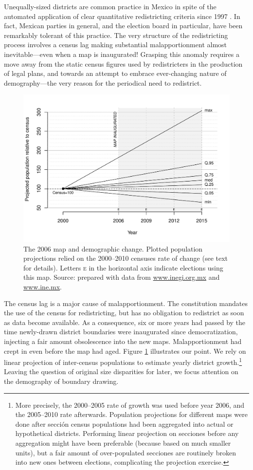 \documentclass[letter,12pt]{article}
\begin{document}
Unequally-sized districts are common practice in Mexico in spite of the automated application of clear quantitative redistricting criteria since 1997 \citep{altman.magar.mcd.trelles2014apsa}. In fact, Mexican parties in general, and the election board in particular, have been remarkably tolerant of this practice. The very structure of the redistricting process involves a census lag making substantial malapportionment almost inevitable---even when a map is inaugurated! Grasping this anomaly requires a move away from the static census figures used by redistricters in the production of legal plans, and towards an attempt to embrace ever-changing nature of demography---the very reason for the periodical need to redistrict.

\begin{figure}
\centering 
  \includegraphics[width=.8\columnwidth]{disRelPopProj2006map.pdf} 
  \caption{The 2006 map and demographic change. Plotted population projections relied on the 2000--2010 censuses rate of change (see text for details). Letters \textsc{e} in the horizontal axis indicate elections using this map. Source: prepared with data from \url{www.inegi.org.mx} and \url{www.ine.mx}.}\label{F:disRelPop2006map}
\end{figure}

The census lag is a major cause of malapportionment. The constitution mandates the use of the census for redistricting, but has no obligation to redistrict as soon as data become available. As a consequence, six or more years had passed by the time newly-drawn district boundaries were inaugurated since democratization, injecting a fair amount obsolescence into the new maps. Malapportionment had crept in even before the map had aged. Figure \ref{F:disRelPop2006map} illustrates our point. We rely on linear projection of inter-census populations to estimate yearly district growth.\footnote{More precisely, the 2000--2005 rate of growth was used before year 2006, and the 2005--2010 rate afterwards. Population projections for different maps were done after secci\'on census populations had been aggregated into actual or hypothetical districts. Performing linear projection on secciones before any aggregation might have been preferable (because based on much smaller units), but a fair amount of over-populated secciones are routinely broken into new ones between elections, complicating the projection exercise.} Leaving the question of original size disparities for later, we focus attention on the demography of boundary drawing.  
\end{document}
